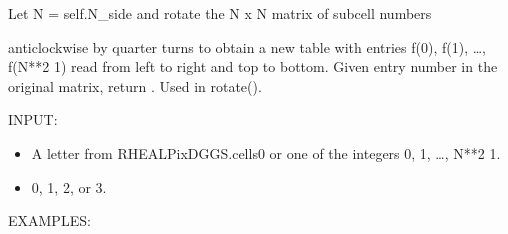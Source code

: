 \documentclass[a4paper,12ptopenany,oneside,english]{sphinxmanual}
\begin{document}
\begin{fulllineitems}

\begin{fulllineitems}
\label{\detokenize{dggs:rhealpixdggs.dggs.Cell.rotate_entry}}
\pysigstartsignatures
{}
\pysigstopsignatures
\sphinxAtStartPar
Let N = self.N\_side and rotate the N x N matrix of subcell numbers

\begin{sphinxVerbatim}[commandchars=\\\{\}]
                     
                   
     
\end{sphinxVerbatim}

\sphinxAtStartPar
anticlockwise by  quarter turns to obtain a
new table with entries f(0), f(1), …, f(N**2 \sphinxhyphen{} 1) read from
left to right and top to bottom.
Given entry number  in the original matrix, return .
Used in rotate().

\sphinxAtStartPar
INPUT:
\begin{itemize}
\item {} 
\sphinxAtStartPar
{} \sphinxhyphen{} A letter from RHEALPixDGGS.cells0 or one of the integers
0, 1, …, N**2 \sphinxhyphen{} 1.

\item {} 
\sphinxAtStartPar
{} \sphinxhyphen{} 0, 1, 2, or 3.

\end{itemize}

\sphinxAtStartPar
EXAMPLES:

\begin{sphinxVerbatim}[commandchars=\\\{\}]
   \PYG{p}{[} \PYG{p}{]}
\PYG{p}{[}     \PYG{p}{]}
\end{sphinxVerbatim}


\end{fulllineitems}
\end{fulllineitems}
\end{document}
